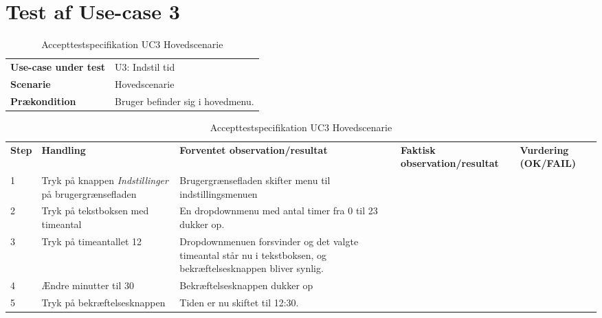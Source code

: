 \section{Test af Use-case 3}
\begin{table}[H]
	\centering
	\caption{Accepttestspecifikation UC3 Hovedscenarie}
	\label{ATUC1:Hovedscenarie}
	\begin{tabular}{ p{80pt}  p{320pt} }\hline
		\rowcolor{white}	
		\textbf{Use-case under test} & U3: Indstil tid \\
		\rowcolor{lightgray}
		\textbf{Scenarie} & Hovedscenarie \\\rowcolor{white}	
		\textbf{Prækondition} & Bruger befinder sig i hovedmenu.
 \\
		\hline
	\end{tabular}
	\begin{tabular}{  p{26pt} p{100pt}  p{101pt} | p{67pt} | p{68pt}}
		\textbf{Step} & \textbf{Handling} & \textbf{Forventet observation/resultat} & \textbf{Faktisk observation/resultat} & \textbf{Vurdering (OK/FAIL)}\\
		1 & Tryk på knappen \emph{Indstillinger} på brugergrænsefladen & Brugergrænsefladen skifter menu til indstillingsmenuen &  &  \\
		2 & Tryk på tekstboksen med timeantal & En dropdownmenu med antal timer fra 0 til 23 dukker op.  &  & \\
		3 & Tryk på timeantallet 12 & Dropdownmenuen forsvinder og det valgte timeantal står nu i tekstboksen, og bekræftelsesknappen bliver synlig. &  &  \\
		
		4 & Ændre minutter til 30 & Bekræftelsesknappen dukker op &  &  \\	
		5 & Tryk på bekræftelsesknappen & Tiden er nu skiftet til 12:30.  &  &  \\
		\hline
	\end{tabular}
\end{table}

